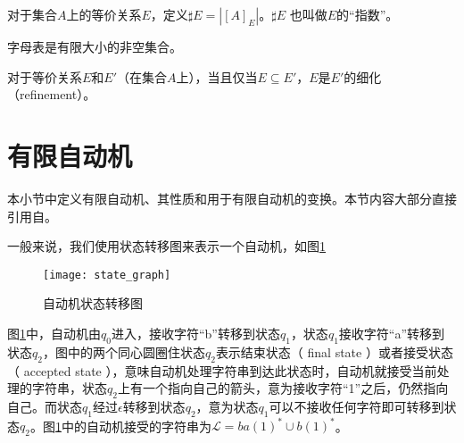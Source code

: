 \begin{definition}
    对于集合$A$上的等价关系$E$，定义$\sharp E = | [A]_E |$。$\sharp E$ 也叫做$E$的“指数”。
\end{definition}


\begin{definition} \label{def:Alphabat}
    字母表是有限大小的非空集合。
\end{definition}

\begin{definition}[等价关系的细化]
    对于等价关系$E$和$E'$（在集合$A$上），当且仅当$E \subseteq E'$，$E$是$E'$的细化（refinement）。
\end{definition}













\section{有限自动机}

本小节中定义有限自动机、其性质和用于有限自动机的变换。本节内容大部分直接引用自\cite{watson1993taxonomyb}。

\begin{remark}
    一般来说，我们使用状态转移图来表示一个自动机，如图\ref{fig:state_graph}
\end{remark}


\begin{figure}[!htbp]
    \centering
    \texttt{[image: state\_graph]}
    \caption{自动机状态转移图}
    \label{fig:state_graph}
\end{figure}

图\ref{fig:state_graph}中，自动机由$q_0$进入，接收字符“b”转移到状态$q_1$，状态$q_1$接收字符“a”转移到状态$q_2$，图中的两个同心圆圈住状态$q_2$表示结束状态（ final state ）或者接受状态（ accepted state ），意味自动机处理字符串到达此状态时，自动机就接受当前处理的字符串，状态$q_2$上有一个指向自己的箭头，意为接收字符“1”之后，仍然指向自己。而状态$q_1$经过$\epsilon$转移到状态$q_2$，意为状态$q_1$可以不接收任何字符即可转移到状态$q_2$。图\ref{fig:state_graph}中的自动机接受的字符串为$\mathcal{L}=ba(1)^*\cup b(1)^*$。

